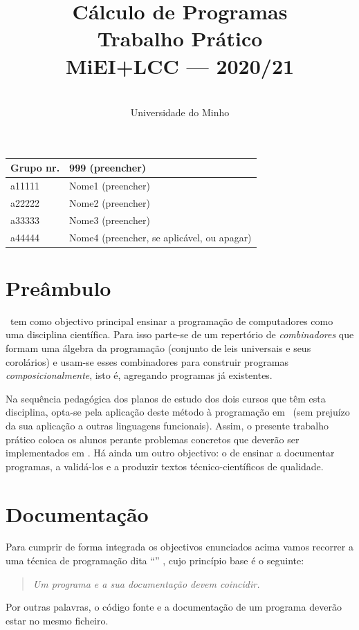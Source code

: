 \documentclass[a4paper]{article}
\title{
       	Cálculo de Programas
\\
       	Trabalho Prático
\\
       	MiEI+LCC --- 2020/21
}
\author{
       	\dium
\\
       	Universidade do Minho
}
\date\mydate
\begin{document}
\maketitle

\begin{center}\large
\begin{tabular}{ll}
\textbf{Grupo} nr. & 999 (preencher)
\\\hline
a11111 & Nome1 (preencher)	
\\
a22222 & Nome2 (preencher)	
\\
a33333 & Nome3 (preencher)	
\\
a44444 & Nome4 (preencher, se aplicável, ou apagar)	
\end{tabular}
\end{center}

\section{Preâmbulo}

\CP\ tem como objectivo principal ensinar
a progra\-mação de computadores como uma disciplina científica. Para isso
parte-se de um repertório de \emph{combinadores} que formam uma álgebra da
programação (conjunto de leis universais e seus corolários) e usam-se esses
combinadores para construir programas \emph{composicionalmente}, isto é,
agregando programas já existentes.
  
Na sequência pedagógica dos planos de estudo dos dois cursos que têm
esta disciplina, opta-se pela aplicação deste método à programação
em \Haskell\ (sem prejuízo da sua aplicação a outras linguagens 
funcionais). Assim, o presente trabalho prático coloca os
alunos perante problemas concretos que deverão ser implementados em
\Haskell.  Há ainda um outro objectivo: o de ensinar a documentar
programas, a validá-los e a produzir textos técnico-científicos de
qualidade.

\section{Documentação} Para cumprir de forma integrada os objectivos
enunciados acima vamos recorrer a uma técnica de programa\-ção dita
``'' \cite{Kn92}, cujo princípio base é o seguinte:
%
\begin{quote}\em Um programa e a sua documentação devem coincidir.
\end{quote}
%
Por outras palavras, o código fonte e a documentação de um
programa deverão estar no mesmo ficheiro.
\end{document}
